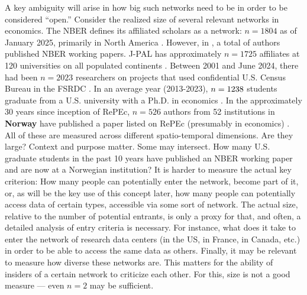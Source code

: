 \documentclass{article}
\begin{document}
A key ambiguity will arise in how big such networks need to be in order to be considered ``open.'' Consider the realized size of several relevant networks in economics. The \ac{NBER} defines its affiliated scholars as a network: $n=1804$ as of January 2025, primarily in North America \citep{national_bureau_of_economic_research_affiliated_2025}. However, in \nberyear{}, a total of \nberauthorsunique{} authors published \nberpapers{} NBER working papers. J-PAL has approximately $n=1725$ affiliates at 120 universities on all populated continents \citep{abdul_latif_jameel_poverty_action_lab_affiliated_2025}. Between 2001 and June 2024, there had been $n=2023$ researchers on projects that used confidential U.S. Census Bureau in the \ac{FSRDC} \citep{us_census_bureau_uscensusbureaufsrdc-external-census-projects_2024}. In an average year (2013-2023), $n=1238{}$ students graduate from a U.S. university with a Ph.D. in economics \citep[Table 1-5]{national_science_foundation_doctorate_2024}. In the approximately 30 years since inception of \ac{RePEc}, $n=526$ authors from 52 institutions in \textbf{Norway} have published a paper listed on \ac{RePEc} (presumably in economics) \citep{ideasrepec_within_2025}. All of these are measured across different spatio-temporal dimensions. Are they large? Context and purpose matter. Some may intersect. How many U.S. graduate students in the past 10 years have published an NBER working paper and are now at a Norwegian institution? %
It is harder to measure the actual key criterion: How many people can potentially enter the network, become part of it, or, as will be the key use of this concept later, how many people can potentially access data of certain types, accessible via some sort of network. The actual size, relative to the number of potential entrants, is only a proxy for that, and often, a detailed analysis of entry criteria is necessary. For instance, what does it take to enter the network of research data centers (in the US, in France, in Canada, etc.) in order to be able to access the same data as others.  Finally, it may be relevant to measure how diverse these networks are. This matters for the ability of insiders of a certain network to criticize each other. For this, size is not a good measure --- even $n=2$ may be sufficient. 
\end{document}
